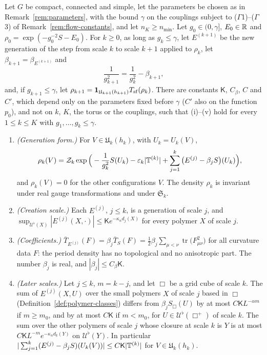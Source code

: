 \begin{maintheorem}\label{thm:N}
Let $G$ be compact, connected and simple, let the parameters be chosen as in Remark~\ref{rem:parameters}, with the bound $\gamma$ on the couplings subject to ($\Gamma$1)--($\Gamma$3) of Remark~\ref{rem:flow-constants}, and let $n_K\ge n_{\min}$. Let $g_0\in(0,\gamma]$, $E_0\in\mathbb R$ and $\rho_0=\exp(-g_0^{-2}S-E_0)$. For $k\ge0$, as long as $g_k\le\gamma$, let $E^{(k+1)}$ be the new generation of the step from scale $k$ to scale $k+1$ applied to $\rho_k$, let $\beta_{k+1}=\beta_{E^{(k+1)}}$ and
\[
\frac1{g_{k+1}^2}=\frac1{g_k^2}-\beta_{k+1},
\]
and, if $g_{k+1}\le\gamma$, let $\rho_{k+1}=\mathbf 1_{\mathfrak U_{k+1}(h_{k+1})}T_{\rm sf}(\rho_k)$. There are constants $\mathsf K$, $C_\beta$, $C$ and $C'$, which depend only on the parameters fixed before $\gamma$ ($C'$ also on the function $p_0$), and not on $k$, $K$, the torus or the couplings, such that (i)--(v) hold for every $1\le k\le K$ with $g_1,\dots,g_k\le\gamma$.
\begin{enumerate}[label=(\roman*)]
\item \emph{(Generation form.)} For $V\in\mathfrak U_k(h_k)$, with $U_k=U_k(V)$,
\[
\rho_k(V)=\mathcal Z_k\exp\Big(-\frac1{g_k^2}S(U_k)-\varepsilon_k|\mathbb T^{(k)}|+\sum_{j=1}^k\big(E^{(j)}-\beta_jS\big)(U_k)\Big),
\]
and $\rho_k(V)=0$ for the other configurations $V$. The density $\rho_k$ is invariant under real gauge transformations and under $\mathfrak S_k$.
\item \emph{(Creation scale.)} Each $E^{(j)}$, $j\le k$, is a generation of scale $j$, and $\sup_{\mathcal U^\flat(X)}|E^{(j)}(X,\cdot)|\le\mathsf Ke^{-\kappa_nd_j(X)}$ for every polymer $X$ of scale $j$.
\item \emph{(Coefficients.)} $\bar T_{E^{(j)}}(F)=\beta_j\bar T_S(F)=\frac12\beta_j\sum_{\mu<\nu}\operatorname{tr}\big(F_{\mu\nu}^2\big)$ for all curvature data $F$: the period density has no topological and no anisotropic part. The number $\beta_j$ is real, and $|\beta_j|\le C_\beta\mathsf K$.
\item \emph{(Later scales.)} Let $j\le k$, $m=k-j$, and let $\Box$ be a grid cube of scale $k$. The sum of $E^{(j)}(X,U)$ over the small polymers $X$ of scale $j$ based in $\Box$ (Definition~\ref{def:polymer-classes}) differs from $\beta_jS_\Box(U)$ by at most $C\mathsf KL^{-\alpha m}$ if $m\ge m_0$, and by at most $C\mathsf K$ if $m<m_0$, for $U\in\mathcal U^\flat(\Box^+)$ of scale $k$. The sum over the other polymers of scale $j$ whose closure at scale $k$ is $Y$ is at most $C\mathsf KL^{-m}e^{-\kappa_nd_k(Y)}$ on $\mathcal U^\flat(Y)$. In particular $|\sum_{j=1}^k(E^{(j)}-\beta_jS)(U_k(V))|\le C\mathsf K|\mathbb T^{(k)}|$ for $V\in\mathfrak U_k(h_k)$.

\end{enumerate}
\end{maintheorem}
